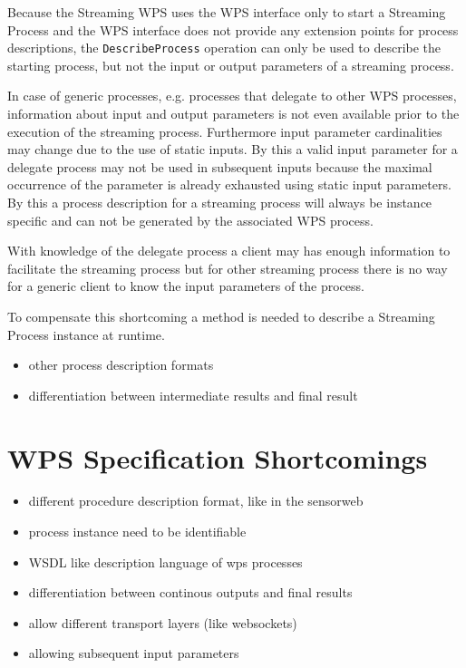 		Because the Streaming \ac{WPS} uses the \ac{WPS} interface only to start a Streaming Process and the \ac{WPS} interface does not provide any extension points for process descriptions, the \texttt{DescribeProcess} operation can only be used to describe the starting process, but not the input or output parameters of a streaming process.

		In case of generic processes, e.g. processes that delegate to other \ac{WPS} processes, information about input and output parameters is not even available prior to the execution of the streaming process. Furthermore input parameter cardinalities may change due to the use of static inputs. By this a valid input parameter for a delegate process may not be used in subsequent inputs because the maximal occurrence of the parameter is already exhausted using static input parameters. By this a process description for a streaming process will always be instance specific and can not be generated by the associated \ac{WPS} process.

		With knowledge of the delegate process a client may has enough information to facilitate the streaming process but for other streaming process there is no way for a generic client to know the input parameters of the process.

		To compensate this shortcoming a method is needed to describe a Streaming Process instance at runtime.
		\begin{itemize}
			\item other process description formats
			\item differentiation between intermediate results and final result
		\end{itemize}
	\section{WPS Specification Shortcomings}
	\begin{itemize}
		\item different procedure description format, like in the sensorweb
		\item process instance need to be identifiable
		\item WSDL like description language of wps processes
		\item differentiation between continous outputs and final results
		\item allow different transport layers (like websockets)
		\item allowing subsequent input parameters
	\end{itemize}
